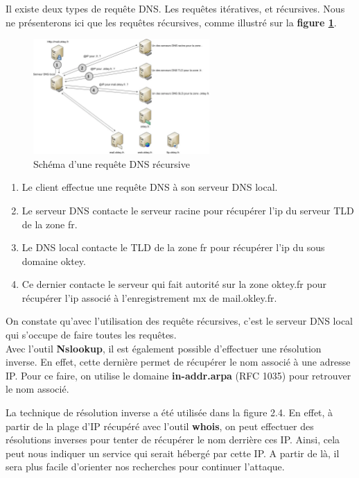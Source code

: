 Il existe deux types de requête DNS. Les requêtes itératives, et récursives. Nous ne présenterons ici que les requêtes récursives, comme illustré sur la \textbf{figure \ref{fig:dns2}}.

\begin{figure}[t]
  \centering
  \includegraphics[width=0.6\textwidth]{oui/images/Nslookup/dns2.png}
  \caption{Schéma d'une requête DNS récursive}
  \label{fig:dns2}
\end{figure}

\begin{enumerate}
    \item Le client effectue une requête DNS à son serveur DNS local.
    \item Le serveur DNS contacte le serveur racine pour récupérer l'ip du serveur TLD de la zone fr.
    \item Le DNS local contacte le TLD de la zone fr pour récupérer l'ip du sous domaine oktey.
    \item Ce dernier contacte le serveur qui fait autorité sur la zone oktey.fr pour récupérer l'ip associé à l'enregistrement mx de mail.okley.fr.
\end{enumerate}

 On constate qu'avec l'utilisation des requête récursives, c'est le serveur DNS local qui s'occupe de faire toutes les requêtes.\\
 Avec l'outil \textbf{Nslookup}, il est également possible d'effectuer une résolution inverse. En effet, cette dernière permet de récupérer le nom associé à une adresse IP. Pour ce faire, on utilise le domaine \textbf{in-addr.arpa} (RFC 1035) pour retrouver le nom associé.

 La technique de résolution inverse a été utilisée dans la figure 2.4. En effet, à partir de la plage d'IP récupéré avec l'outil \textbf{whois}, on peut effectuer des résolutions inverses pour tenter de récupérer le nom derrière ces IP. Ainsi, cela peut nous indiquer un service qui serait hébergé par cette IP. A partir de là, il sera plus facile d'orienter nos recherches pour continuer l'attaque.


